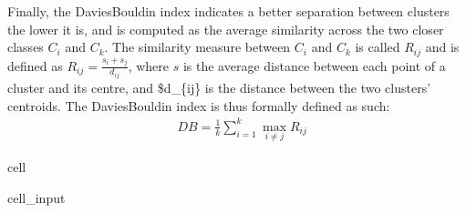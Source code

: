 \documentclass[letterpaper,10pt,english]{jupyterBook}
\begin{document}
\sphinxAtStartPar
Finally, the Davies\sphinxhyphen{}Bouldin index indicates a better separation between clusters the lower it is, and is computed as the average similarity across the two closer classes \(C_i\) and \(C_k\). The similarity measure between \(C_i\) and \(C_k\) is called \(R_{ij}\) and is defined as \(R_{ij} = \frac{s_i + s_j}{d_{ij}}\), where \(s\) is the average distance between each point of a cluster and its centre, and \$d\_\{ij\} is the distance between the two clusters’ centroids. The Davies\sphinxhyphen{}Bouldin index is thus formally defined as such:
\label{equation:04-stations_kmeans:57753249-7bab-40bc-bba9-680132af5d50}\begin{align}
& DB = \frac{1}{k} \sum_{i=1}^k \max_{i \neq j} R_{ij}
\end{align}
\begin{sphinxuseclass}{cell}
\begin{sphinxuseclass}{cell_input}
\begin{sphinxVerbatim}[commandchars=\\\{\}]
     
   
   
   


     
       
          \PYG{p}{[} \PYG{p}{]}
     


   
\end{sphinxVerbatim}

\end{sphinxuseclass}
\end{sphinxuseclass}
\end{document}
